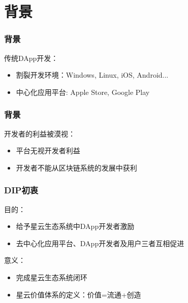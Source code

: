 
\section{背景}
\begin{frame}
	\frametitle{背景}
  传统DApp开发：
  \begin{itemize}
  \item 割裂开发环境：Windows, Linux, iOS, Android...
  \item 中心化应用平台: Apple Store, Google Play
  \end{itemize}
\end{frame}

\begin{frame}
	\frametitle{背景}
  开发者的利益被漠视：
  \begin{itemize}
  \item 平台无视开发者利益
  \item 开发者不能从区块链系统的发展中获利
  \end{itemize}
\end{frame}


\begin{frame}
	\frametitle{DIP初衷}
  目的：
  \begin{itemize}
  \item 给予星云生态系统中DApp开发者激励
  \item 去中心化应用平台、DApp开发者及用户三者互相促进
  \end{itemize}
  意义：
  \begin{itemize}
  \item 完成星云生态系统闭环
  \item 星云价值体系的定义：价值=流通+创造
  \end{itemize}
\end{frame}